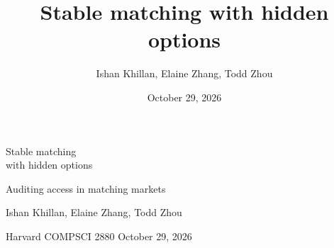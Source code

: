 \documentclass[aspectratio=169,14pt]{beamer}
\title{Stable matching with hidden options}
\author{Ishan Khillan, Elaine Zhang, Todd Zhou}
\date{October 29, 2026}
\newif\ifbackup
\newcounter{mainframes}
\begin{document}
\begin{frame}[plain,label=opening]
\vspace{5mm}
{\fontsize{26}{30}\selectfont Stable matching\\with hidden options\par}
\vspace{4mm}
{\large Auditing access in matching markets\par}
\vspace{8mm}
Ishan Khillan, Elaine Zhang, Todd Zhou\par
{\small Harvard COMPSCI 2880 \quad October 29, 2026\par}
\vfill

\end{frame}





\setcounter{mainframes}{\value{framenumber}}
\backuptrue
\appendix

\end{document}
